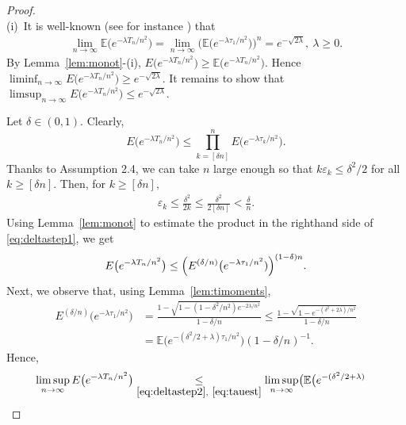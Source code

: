 \documentclass[12pt]{amsart}
\begin{document}
\begin{proof}~
\\
(i)~It is well-known (see for instance \cite[p. 394]{durrett}) that
\begin{eqnarray*} \label{eq:bmtn} \lim_{n\to\infty} {{\mathbb E}}\bigl( e^{-\lambda
T_n/n^2}\bigr)=\lim_{n\to\infty} \bigl( {{\mathbb E}} \bigl( e^{-\lambda
\tau_1/n^2}\bigr)\bigr)^n = e^{-\sqrt{2\lambda}},~\lambda \ge 0.
\end{eqnarray*} By Lemma~\ref{lem:monot}-(i), $ E \bigl(e^{-\lambda
T_n/n^2}\bigr) \ge {{\mathbb E}}\bigl( e^{-\lambda T_n/n^2}\bigr)$. Hence $
\liminf_{n\to\infty} E \bigl( e^{-\lambda T_n/n^2}\bigr) \ge
e^{-\sqrt{2\lambda}}$. It remains to show that $\displaystyle
\limsup_{n\to\infty} E\bigl( e^{-\lambda T_n/n^2}\bigr)\le
e^{-\sqrt{2\lambda}}$.
\par
Let $\delta\in (0,1)$. Clearly,
\begin{equation}
\label{eq:deltastep1}
E \bigl( e^{-\lambda T_n/n^2} \bigr)\le \prod_{k=[\delta n]}^n E\bigl( e^{-\lambda \tau_k/n^2}\bigr) .
\end{equation}
Thanks to Assumption 2.4, we can take $n$ large enough so that
$k{\varepsilon}_k \le \delta^2/2$ for all $k\geq [\delta n].$ Then, for
$k\ge [\delta n],$ \begin{eqnarray} \label{esti} {\varepsilon}_k \le
\frac{\delta^2}{2k}\le \frac{\delta^2}{2[\delta
n]}<\frac{\delta}{n}.\end{eqnarray} Using Lemma~\ref{lem:monot} to estimate
the product in the righthand side of \eqref{eq:deltastep1}, we get
\begin{equation}
\label{eq:deltastep2} E\bigl( e^{-\lambda T_n/n^2}\bigr) \le \Bigl( E^{(\delta/n)}
\bigl( e^{-\lambda\tau_1/n^2 })\Bigr) ^{(1-\delta)n}.
\end{equation}
Next, we observe that, using Lemma~\ref{lem:timoments},
\begin{align}
\nonumber
E^{(\delta/n)}\bigl(  e^{-\lambda\tau_1/n^2 }\bigr) &
\underset{\mbox{  }}{=}
\frac {1-\sqrt{1-(1-\delta^2/n^2)e^{-2\lambda/n^2}}} {1-\delta/n}
\leq \frac{1-\sqrt{1-e^{-(\delta^2+2\lambda)/n^2}}}{1-\delta/n}\\
\label{eq:tauest}
&=
{{\mathbb E}}\bigl( e^{-(\delta^2/2+\lambda) \tau_1/n^2}\bigr) (1-\delta/n)^{-1}.
\end{align}
Hence,
\begin{align*}
\limsup_{n\to\infty} E \bigl(e^{-\lambda T_n/n^2}\bigr) &\underset{
\eqref{eq:deltastep2},~\eqref{eq:tauest}}{\le} \limsup_{n\to\infty}
\bigl({{\mathbb E}}\bigl( e^{-(\delta^2/2+\lambda)
}
\end{align*}
\end{proof}
\end{document}
